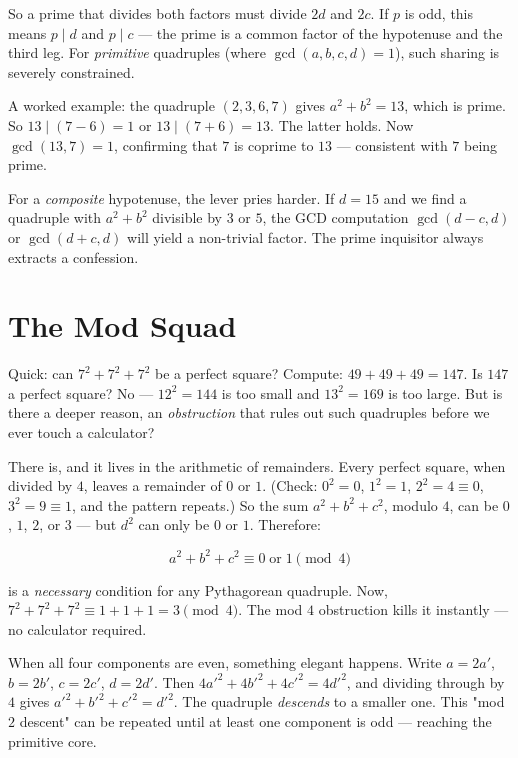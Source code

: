 \documentclass[11pt,twoside,openright]{book}
\theoremstyle{definition}
\theoremstyle{remark}
\begin{document}
So a prime that divides both factors must divide $2d$ and $2c$. If $p$ is odd, this means $p \mid d$ and $p \mid c$ --- the prime is a common factor of the hypotenuse and the third leg. For \textit{primitive} quadruples (where $\gcd(a, b, c, d) = 1$), such sharing is severely constrained.

A worked example: the quadruple $(2, 3, 6, 7)$ gives $a^2 + b^2 = 13$, which is prime. So $13 \mid (7 - 6) = 1$ or $13 \mid (7 + 6) = 13$. The latter holds. Now $\gcd(13, 7) = 1$, confirming that $7$ is coprime to $13$ --- consistent with $7$ being prime.

For a \textit{composite} hypotenuse, the lever pries harder. If $d = 15$ and we find a quadruple with $a^2 + b^2$ divisible by $3$ or $5$, the GCD computation $\gcd(d - c, d)$ or $\gcd(d + c, d)$ will yield a non-trivial factor. The prime inquisitor always extracts a confession.



\section{The Mod Squad}

Quick: can $7^2 + 7^2 + 7^2$ be a perfect square? Compute: $49 + 49 + 49 = 147$. Is $147$ a perfect square? No --- $12^2 = 144$ is too small and $13^2 = 169$ is too large. But is there a deeper reason, an \textit{obstruction} that rules out such quadruples before we ever touch a calculator?

There is, and it lives in the arithmetic of remainders. Every perfect square, when divided by $4$, leaves a remainder of $0$ or $1$. (Check: $0^2 = 0$, $1^2 = 1$, $2^2 = 4 \equiv 0$, $3^2 = 9 \equiv 1$, and the pattern repeats.) So the sum $a^2 + b^2 + c^2$, modulo $4$, can be $0$, $1$, $2$, or $3$ --- but $d^2$ can only be $0$ or $1$. Therefore:

\[a^2 + b^2 + c^2 \equiv 0 \;\text{or}\; 1 \pmod{4}\]

is a \textit{necessary} condition for any Pythagorean quadruple. Now, $7^2 + 7^2 + 7^2 \equiv 1 + 1 + 1 = 3 \pmod{4}$. The mod $4$ obstruction kills it instantly --- no calculator required.

When all four components are even, something elegant happens. Write $a = 2a'$, $b = 2b'$, $c = 2c'$, $d = 2d'$. Then $4a'^2 + 4b'^2 + 4c'^2 = 4d'^2$, and dividing through by $4$ gives $a'^2 + b'^2 + c'^2 = d'^2$. The quadruple \textit{descends} to a smaller one. This "mod $2$ descent" can be repeated until at least one component is odd --- reaching the primitive core.
\end{document}
